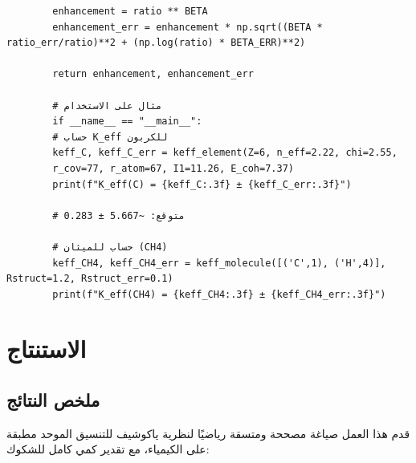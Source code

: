 \documentclass[12pt,a4paper]{article}
\theoremstyle{remark}
\begin{document}
\begin{verbatim}
		enhancement = ratio ** BETA
		enhancement_err = enhancement * np.sqrt((BETA * ratio_err/ratio)**2 + (np.log(ratio) * BETA_ERR)**2)
		
		return enhancement, enhancement_err
		
		# مثال على الاستخدام
		if __name__ == "__main__":
		# حساب K_eff للكربون
		keff_C, keff_C_err = keff_element(Z=6, n_eff=2.22, chi=2.55, 
		r_cov=77, r_atom=67, I1=11.26, E_coh=7.37)
		print(f"K_eff(C) = {keff_C:.3f} ± {keff_C_err:.3f}")
		
		# متوقع: ~5.667 ± 0.283
		
		# حساب للميثان (CH4)
		keff_CH4, keff_CH4_err = keff_molecule([('C',1), ('H',4)], Rstruct=1.2, Rstruct_err=0.1)
		print(f"K_eff(CH4) = {keff_CH4:.3f} ± {keff_CH4_err:.3f}")
	\end{verbatim}
	
	\section{الاستنتاج}
	\label{sec:conclusion}
	
	\subsection{ملخص النتائج}
	
	قدم هذا العمل صياغة مصححة ومتسقة رياضيًا لنظرية ياكوشيف للتنسيق الموحد مطبقة على الكيمياء، مع تقدير كمي كامل للشكوك:
	
\end{document}
